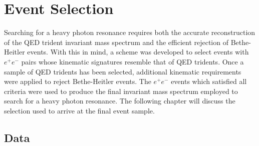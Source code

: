 %
%
%
%
\chapter{Event Selection}

Searching for a heavy photon resonance requires both the accurate 
reconstruction of the QED trident invariant mass spectrum and the efficient 
rejection of Bethe-Heitler events.  With this in mind, a scheme 
was developed to select events with $e^+e^-$ pairs whose kinematic signatures
resemble that of QED tridents.  Once a sample of QED tridents has been selected, 
additional kinematic 
requirements were applied to reject Bethe-Heitler events.  The  $e^+e^-$ events
which satisfied all criteria were used to produce the final invariant mass 
spectrum employed to search for a heavy photon resonance.  The following chapter
will discuss the selection used to arrive at the final event sample.   

\section{Data}

